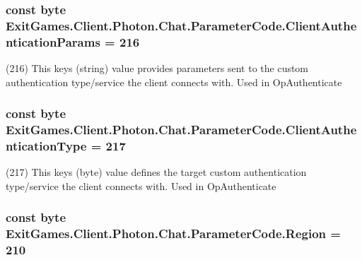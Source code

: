 \subsubsection[{\texorpdfstring{Client\+Authentication\+Params}{ClientAuthenticationParams}}]{\setlength{\rightskip}{0pt plus 5cm}const byte Exit\+Games.\+Client.\+Photon.\+Chat.\+Parameter\+Code.\+Client\+Authentication\+Params = 216}\hypertarget{class_exit_games_1_1_client_1_1_photon_1_1_chat_1_1_parameter_code_a70f578a01789db64e2aefa055fba1732}{}\label{class_exit_games_1_1_client_1_1_photon_1_1_chat_1_1_parameter_code_a70f578a01789db64e2aefa055fba1732}


(216) This key\textquotesingle{}s (string) value provides parameters sent to the custom authentication type/service the client connects with. Used in Op\+Authenticate

\subsubsection[{\texorpdfstring{Client\+Authentication\+Type}{ClientAuthenticationType}}]{\setlength{\rightskip}{0pt plus 5cm}const byte Exit\+Games.\+Client.\+Photon.\+Chat.\+Parameter\+Code.\+Client\+Authentication\+Type = 217}\hypertarget{class_exit_games_1_1_client_1_1_photon_1_1_chat_1_1_parameter_code_a244b3fc5ac2e8b3a97428b6534ca9da6}{}\label{class_exit_games_1_1_client_1_1_photon_1_1_chat_1_1_parameter_code_a244b3fc5ac2e8b3a97428b6534ca9da6}


(217) This key\textquotesingle{}s (byte) value defines the target custom authentication type/service the client connects with. Used in Op\+Authenticate

\subsubsection[{\texorpdfstring{Region}{Region}}]{\setlength{\rightskip}{0pt plus 5cm}const byte Exit\+Games.\+Client.\+Photon.\+Chat.\+Parameter\+Code.\+Region = 210}\hypertarget{class_exit_games_1_1_client_1_1_photon_1_1_chat_1_1_parameter_code_a858cbc8aac0919b92ab761e92decf1da}{}\label{class_exit_games_1_1_client_1_1_photon_1_1_chat_1_1_parameter_code_a858cbc8aac0919b92ab761e92decf1da}



